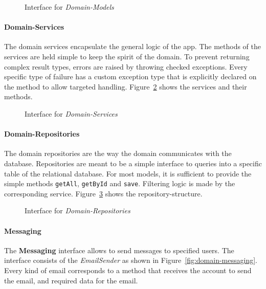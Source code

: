 \begin{figure}
    \centering

    \caption{Interface for \textit{Domain-Models}}
    \label{fig:domain-models}
\end{figure}

\paragraph{Domain-Services} \label{par:domain-services}
The domain services encapsulate the general logic of the app. \newline
The methods of the services are held simple to keep the spirit of the domain.
To prevent returning complex result types, errors are raised by throwing checked exceptions.
Every specific type of failure has a custom exception type that is explicitly declared on the method to allow targeted handling.
Figure~\ref{fig:domain-services} shows the services and their methods.

\begin{figure}
    \centering

    \caption{Interface for \textit{Domain-Services}}
    \label{fig:domain-services}
\end{figure}

\paragraph{Domain-Repositories}\label{par:domain-repositories}
The domain repositories are the way the domain communicates with the database. \newline
Repositories are meant to be a simple interface to queries into a specific table of the relational database.
For most models, it is sufficient to provide the simple methods \texttt{getAll}, \texttt{getById} and \texttt{save}.
Filtering logic is made by the corresponding service.
Figure~\ref{fig:domain-repositories} shows the repository-structure.

\begin{figure}
    \centering

    \caption{Interface for \textit{Domain-Repositories}}
    \label{fig:domain-repositories}
\end{figure}

\paragraph{Messaging}
The \textbf{Messaging} interface allows to send messages to specified users.
The interface consists of the \textit{EmailSender} as shown in Figure~\ref{fig:domain-messaging}.
Every kind of email corresponds to a method that receives the account to send the email, and required data for the email.

